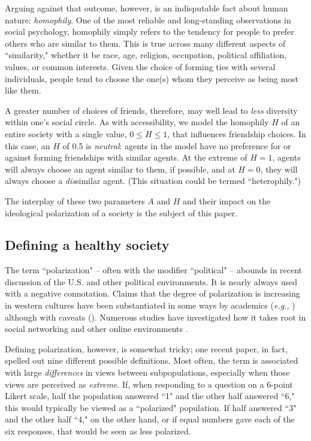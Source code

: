 Arguing against that outcome, however, is an indisputable fact about human
nature: \textit{homophily}. One of the most reliable and long-standing
observations in social psychology, homophily simply refers to the tendency for
people to prefer others who are similar to them.\cite{mcpherson_birds_2001}
This is true across many different aspects of ``similarity," whether it be
race, age, religion, occupation, political affiliation, values, or common
interests. Given the choice of forming ties with several individuals, people
tend to choose the one(s) whom they perceive as being most like them. 

A greater number of choices of friends, therefore, may well lead to
\textit{less} diversity within one's social circle. As with accessibility, we
model the homophily $H$ of an entire society with a single value, $0 \leq H
\leq 1$, that influences friendship choices. In this case, an $H$ of 0.5 is
\textit{neutral}: agents in the model have no preference for or against
forming friendships with similar agents. At the extreme of $H=1$, agents will
always choose an agent similar to them, if possible, and at $H=0$, they will
always choose a \textit{dis}similar agent. (This situation could be termed
``heterophily.")

The interplay of these two parameters $A$ and $H$ and their impact on the
ideological polarization of a society is the subject of this paper.

\subsection{Defining a healthy society}

The term ``polarization" -- often with the modifier ``political" -- abounds in
recent discussion of the U.S. and other political
env\-ironments\cite{campbell_source_2016,french_were_2017,dimock_political_2014,mccarty_polarized_2016}.
It is nearly always used with a negative connotation. Claims that the degree
of polarization is increasing in western cultures have been substantiated in
some ways by academics (\textit{e.g.},
\cite{baldassarri_partisans_2008,prior_media_2013,abramowitz_new_2015})
although with caveats
(\cite{baldassarri_dynamics_2007,fiorina_political_2008,abrams_party_2015}).
Numerous studies have investigated how it takes root in social networking and
other online environments
\cite{mousavi_role_2014,conover_political_2011,adamic_political_2005,hargittai_cross-ideological_2008}.

Defining polarization, however, is somewhat tricky; one recent paper, in fact,
spelled out nine different possible
definitions\cite{bramson_disambiguation_2016}. Most often, the term is
associated with large \textit{differences} in views between subpopulations,
especially when those views are perceived as \textit{extreme}. If, when
responding to a question on a 6-point Likert scale, half the population
answered ``1" and the other half answered ``6," this would typically be viewed
as a ``polarized" population. If half answered ``3" and the other half ``4,"
on the other hand, or if equal numbers gave each of the six responses, that
would be seen as less polarized.


